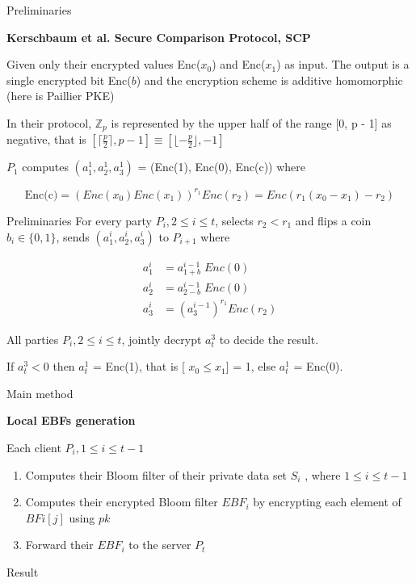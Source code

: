 \begin{frame}{Preliminaries}
    
    \textbf{Kerschbaum et al. Secure Comparison Protocol, SCP}

    \vspace{0.25cm}

    Given
only their encrypted values Enc($x_0$) and Enc($x_1$) as input.
The output is a single encrypted bit Enc($b$) and the encryption scheme is additive homomorphic (here is Paillier PKE)

    In their protocol, $\mathbb{Z}_p$
is represented by the upper half of the range [0, p - 1] as
negative, that is $[\lceil \frac{p}{2} \rceil, p-1] \equiv [\lfloor -\frac{p}{2} \rfloor, -1]$ 

\vspace{0.5cm}

$P_1$ computes $(a_1^1,a_2^1,a_3^1)$ = (Enc(1), Enc(0), Enc(c)) where


$$\text{Enc(c)} = (Enc(x_0)Enc(x_1))^{r_1}Enc(r_2) = Enc(r_1(x_0-x_1)-r_2)$$





\end{frame}

\begin{frame}{Preliminaries}
    For every party $P_i, 2 \leq i \leq t$, selects $r_2 < r_1 $ and flips a coin $b_i \in \{0, 1\}$, sends $(a_1^i,a_2^i,a_3^i)$ to $P_{i+1}$
where 

\begin{align}
    a_1^i &= a_{1+b}^{i-1} \; Enc(0) \nonumber \\
    a_2^i &= a_{2-b}^{i-1}\; Enc(0) \nonumber \\
    a_3^i &= (a_3^{i-1})^{r_1}Enc(r_2)  \nonumber
\end{align}

All parties $P_i, 2 \leq i \leq t$, jointly decrypt $a_t^3$
to decide the result. 

\vspace{0.25cm}

If $a_t^3 < 0$ then $a_t^1$ = Enc(1), that is [ $x_0 \leq x_1$] = 1, else $a_t^1$
= Enc(0).
\end{frame}


\begin{frame}{Main method}

    \textbf{Local EBFs generation}

    \vspace{0.25cm} 

    Each client $P_i, 1 \leq i \leq t-1$
    \begin{enumerate}
        \item Computes their Bloom filter of their private data set $S_i$ ,
        where $1 \leq i \leq t-1$
        \item Computes their encrypted Bloom filter ${EBF_i}$ by encrypting
        each element of $BFi[j]$ using $pk$
        \item  Forward their $EBF_i$ to the server $P_t$
    \end{enumerate}


\end{frame}

\begin{frame}{Result}

\end{frame}